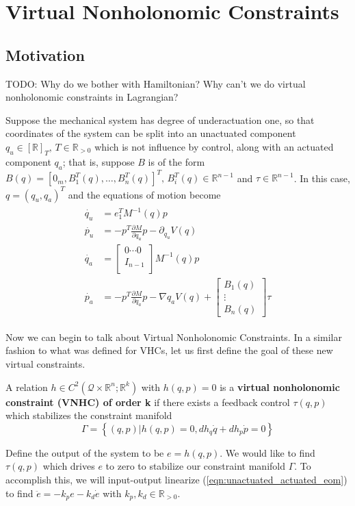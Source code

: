 
\section{Virtual Nonholonomic Constraints}\label{sec:vnhcs}

\subsection{Motivation}
TODO: Why do we bother with Hamiltonian? Why can't we do virtual nonholonomic constraints in Lagrangian?

Suppose the mechanical system has degree of underactuation one, so that coordinates of the system can be split into an unactuated component \(q_u \in [\mathbb{R}]_T, \, T \in \mathbb{R}_{>0}\) which is not influence by control, along with an actuated component \(q_a\); that is, suppose \(B\) is of the form \(B(q) = [0_m, B_1^T(q), \ldots, B_n^T(q)]^T, \, B_i^T(q) \in \mathbb{R}^{n-1}\) and \(\tau \in \mathbb{R}^{n-1}\). In this case, \(q = (q_u, q_a)^T\) and the equations of motion become
\begin{align}\label{eqn:unactuated_actuated_eom}
\begin{split}
\dot{q_u} &= e_1^T M^{-1}(q) p \\
\dot{p_u} &= -p^T\frac{\partial M}{\partial q_u} p - \partial_{q_u}V(q) \\
\dot{q_a} &= 
\begin{bmatrix}
0 \cdots 0 \\
I_{n-1} \\
\end{bmatrix} M^{-1}(q) p \\
\dot{p_a} &= -p^T\frac{\partial M}{\partial q_a} p - \nabla{q_a}V(q) + 
\begin{bmatrix}
B_1(q) \\
\vdots \\
B_n(q)
\end{bmatrix} \tau
\end{split}
\end{align}

Now we can begin to talk about Virtual Nonholonomic Constraints. In a similar fashion to what was defined for VHCs, let us first define the goal of these new virtual constraints.

\begin{defn}
A relation \(h \in C^2\left(\mathcal{Q}\times \mathbb{R}^n ; \mathbb{R}^k\right)\) with \(h(q,p) = 0\) is a \textbf{virtual nonholonomic constraint (VNHC) of order k} if there exists a feedback control \(\tau(q,p)\) which stabilizes the constraint manifold
\[
\Gamma = \left\{(q,p) | h(q,p) = 0, dh_q \dot{q} + dh_p \dot{p} = 0\right\}
\]
\end{defn}
Define the output of the system to be \(e = h(q,p)\). We would like to find \(\tau(q,p)\) which drives \(e\) to zero to stabilize our constraint manifold \(\Gamma\). To accomplish this, we will input-output linearize (\ref{eqn:unactuated_actuated_eom}) to find \(\ddot{e} = -k_p e - k_d \dot{e}\) with \(k_p, k_d \in \mathbb{R}_{> 0}\).

